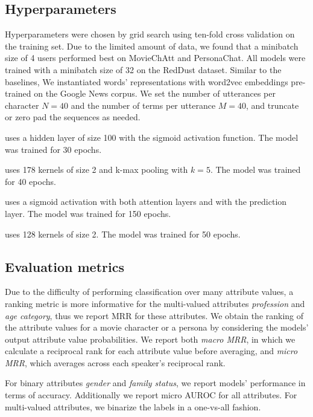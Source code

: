 \subsection{Hyperparameters}
Hyperparameters were chosen by grid search using ten-fold cross validation on the training set.
Due to the limited amount of data, we found that a minibatch size of 4 users performed best on MovieChAtt and PersonaChat.
All models were trained with a minibatch size of 32 on the RedDust dataset.
Similar to the baselines, We instantiated words' representations with word2vec embeddings pre-trained on the Google News corpus.
We set the number of utterances per character $N=40$ and the number of terms per utterance $M=40$, and truncate or zero pad the sequences as needed.

\squishlist
\item \textbf{} uses a hidden layer of size 100 with the sigmoid activation function. The model was trained for 30 epochs.
\item \textbf{} uses 178 kernels of size 2 and k-max pooling with $k=5$. The model was trained for 40 epochs.
\item \textbf{} uses a sigmoid activation with both attention layers and with the prediction layer.
The model was trained for 150 epochs.
\item \textbf{} uses 128 kernels of size 2. The model was trained for 50 epochs.
\squishend

 \subsection{Evaluation metrics}
\label{metric}

Due to the difficulty of performing classification over many attribute values, a ranking metric is more informative for the multi-valued attributes \textit{profession} and \textit{age category}, thus we report MRR for these attributes. We obtain the ranking of the attribute values for a movie character or a persona by considering the models' output attribute value probabilities.
We report both \textit{macro MRR}, in which we calculate a reciprocal rank for each attribute value before averaging, and \textit{micro MRR}, which averages across each speaker's reciprocal rank.

For binary attributes \textit{gender} and \textit{family status}, we report models' performance in terms of accuracy. Additionally we report micro AUROC for all attributes. For multi-valued attributes, we binarize the labels in a one-vs-all fashion.